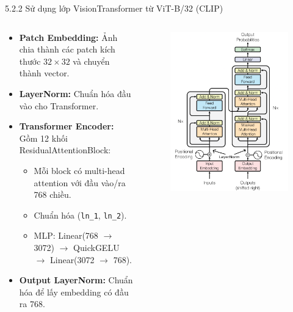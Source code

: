 \begin{frame}{5.2.2 Sử dụng lớp VisionTransformer từ ViT-B/32 (CLIP)}
\begin{columns}
    \begin{column}{0.62\textwidth}
        \begin{itemize}
        \item \textbf{Patch Embedding:} Ảnh chia thành các patch kích thước $32 \times 32$ và chuyển thành vector.
    \item \textbf{LayerNorm:} Chuẩn hóa đầu vào cho Transformer.
    \item \textbf{Transformer Encoder:} Gồm 12 khối ResidualAttentionBlock:
    \begin{itemize}
        \item Mỗi block có multi-head attention với đầu vào/ra 768 chiều.
        \item Chuẩn hóa (\texttt{ln\_1}, \texttt{ln\_2}).
        \item MLP: Linear(768 $\rightarrow$ 3072) $\rightarrow$ QuickGELU $\rightarrow$ Linear(3072 $\rightarrow$ 768).
    \end{itemize}
    \item \textbf{Output LayerNorm:} Chuẩn hóa để lấy embedding có đầu ra 768.
        \end{itemize}
    \end{column}
    \begin{column}{0.25\textwidth}
        \centering
        \begin{figure}
            \centering            \includegraphics[width=\linewidth]{img/05-visontransformer.png} 

\end{figure}
\end{column}
\end{columns}
\end{frame}
